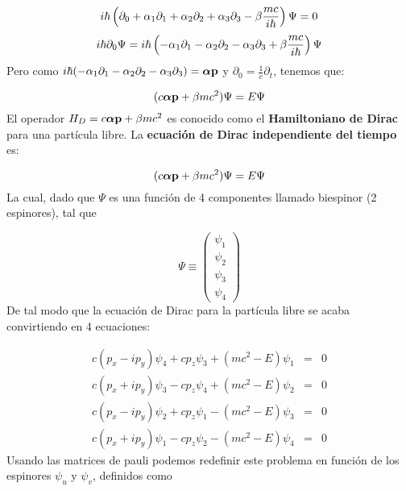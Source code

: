 \begin{equation}
    i \hbar \left( \partial_0 + \alpha_1 \partial_1 + \alpha_2 \partial_2 + \alpha_3 \partial_3 - \beta \frac{mc}{i \hbar} \right)\Psi = 0
\end{equation}
\begin{equation}
    i \hbar \partial_0 \Psi = i \hbar \left( - \alpha_1 \partial_1 - \alpha_2 \partial_2 - \alpha_3 \partial_3 + \beta \frac{mc}{i \hbar} \right)\Psi 
\end{equation}
Pero como $i\hbar (-\alpha_1 \partial_1 - \alpha_2 \partial_2 -\alpha_3 \partial_3)=\boldsymbol{\alpha} \mathbf{p}$ y $\partial_0 = \frac{1}{c} \partial_t$, tenemos que:

\begin{equation}
    (c\boldsymbol{\alpha} \mathbf{p} + \beta mc^2) \Psi = E\Psi
\end{equation}
El operador $H_D = c \boldsymbol{\alpha} \mathbf{p} + \beta mc^2$ es conocido como el \textbf{Hamiltoniano de Dirac} para una partícula libre. La {\bf ecuación de Dirac independiente del tiempo} es:

\begin{equation}
    (c\boldsymbol{\alpha} \mathbf{p} + \beta mc^2) \Psi = E\Psi
\end{equation}
La cual, dado que $\Psi$ es una función de 4 componentes llamado biespinor (2 espinores), tal que

\begin{equation}
    \Psi \equiv \begin{pmatrix}
        \psi_1 \\ \psi_2 \\ \psi_3 \\ \psi_4
    \end{pmatrix}
\end{equation}
De tal modo que la ecuación de Dirac para la partícula libre se acaba convirtiendo en 4 ecuaciones:

\begin{equation} 
    \begin{array}{ccc}
    c(p_x - i p_y) \psi_4 + c p_z \psi_3 + (mc^2 -E) \psi_1 & = & 0 \\
    c(p_x + i p_y) \psi_3 - c p_z \psi_4 + (mc^2 -E) \psi_2 & = & 0 \\
    c(p_x - i p_y) \psi_2 + c p_z \psi_1 - (mc^2 -E) \psi_3 & = & 0 \\
    c(p_x + i p_y) \psi_1 - c p_z \psi_2 - (mc^2 -E) \psi_4 & = & 0
    \end{array}
\end{equation}  
Usando las matrices de pauli podemos redefinir este problema en función de los espinores $\psi_u$ y $\psi_v$, definidos como

